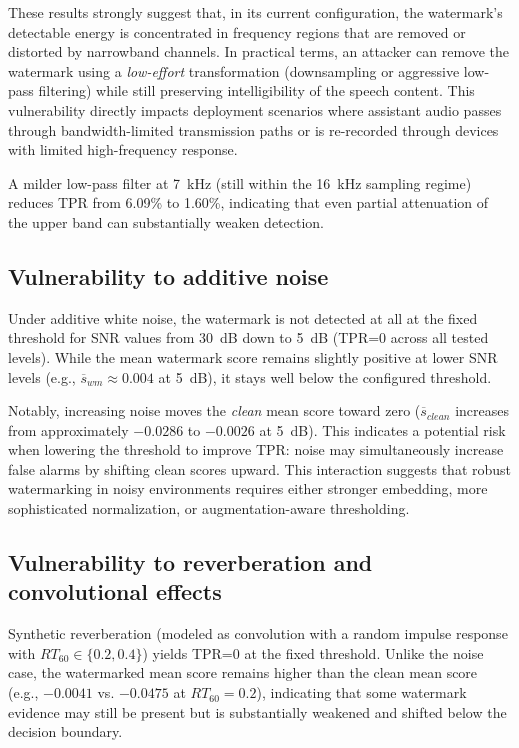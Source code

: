 These results strongly suggest that, in its current configuration, the watermark's
detectable energy is concentrated in frequency regions that are removed or
distorted by narrowband channels. In practical terms, an attacker can remove the
watermark using a \emph{low-effort} transformation (downsampling or aggressive
low-pass filtering) while still preserving intelligibility of the speech content.
This vulnerability directly impacts deployment scenarios where assistant audio
passes through bandwidth-limited transmission paths or is re-recorded through
devices with limited high-frequency response.

A milder low-pass filter at 7~kHz (still within the 16~kHz sampling regime)
reduces TPR from 6.09\% to 1.60\%, indicating that even partial attenuation of
the upper band can substantially weaken detection.

\subsection{Vulnerability to additive noise}
\label{subsec:wm-noise}

Under additive white noise, the watermark is not detected at all at the fixed
threshold for SNR values from 30~dB down to 5~dB (TPR=0 across all tested
levels). While the mean watermark score remains slightly positive at lower SNR
levels (e.g., $\overline{s}_{wm}\approx 0.004$ at 5~dB), it stays well below the
configured threshold.

Notably, increasing noise moves the \emph{clean} mean score toward zero
($\overline{s}_{clean}$ increases from approximately $-0.0286$ to $-0.0026$ at
5~dB). This indicates a potential risk when lowering the threshold to improve
TPR: noise may simultaneously increase false alarms by shifting clean scores
upward. This interaction suggests that robust watermarking in noisy environments
requires either stronger embedding, more sophisticated normalization, or
augmentation-aware thresholding.

\subsection{Vulnerability to reverberation and convolutional effects}
\label{subsec:wm-reverb}

Synthetic reverberation (modeled as convolution with a random impulse response
with $RT_{60}\in\{0.2,0.4\}$) yields TPR=0 at the fixed threshold. Unlike the
noise case, the watermarked mean score remains higher than the clean mean score
(e.g., $-0.0041$ vs. $-0.0475$ at $RT_{60}=0.2$), indicating that some watermark
evidence may still be present but is substantially weakened and shifted below the
decision boundary.

